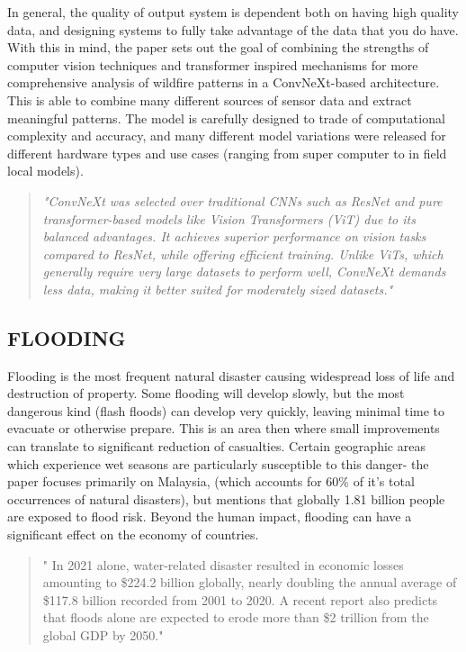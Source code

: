 \documentclass[conference,a4paper]{IEEEtran}
\begin{document}
In general, the quality of output system is dependent both on having high quality data, and designing systems to fully take advantage of the data that you do have. With this in mind, the paper sets out the goal of combining the strengths of computer vision techniques and transformer inspired mechanisms for more comprehensive analysis of wildfire patterns in a ConvNeXt-based architecture. This is able to combine many different sources of sensor data and extract meaningful patterns. The model is carefully designed to trade of computational complexity and accuracy, and many different model variations were released for different hardware types and use cases (ranging from super computer to in field local models).

\begin{quote}
\textit{"ConvNeXt was selected over traditional CNNs such as ResNet and pure transformer-based models like Vision Transformers (ViT) due to its balanced advantages. It achieves superior performance on vision tasks compared to ResNet, while offering efficient training. Unlike ViTs, which generally require very large datasets to perform well, ConvNeXt demands less data, making it better suited for moderately sized datasets."}
\end{quote}
\cite{elbohy2025fusion}


\subsection{FLOODING}

Flooding is the most frequent natural disaster causing widespread loss of life and destruction of property. Some flooding will develop slowly, but the most dangerous kind (flash floods) can develop very quickly, leaving minimal time to evacuate or otherwise prepare. This is an area then where small improvements can translate to significant reduction of casualties. Certain geographic areas which experience wet seasons are particularly susceptible to this danger- the paper focuses primarily on Malaysia, (which accounts for 60\% of it's total occurrences of natural disasters), but mentions that globally 1.81 billion people are exposed to flood risk. Beyond the human impact, flooding can have a significant effect on the economy of countries.

\begin{quote}
    " In 2021 alone, water-related disaster resulted in economic losses amounting to \$224.2 billion  globally, nearly doubling the annual average of \$117.8 billion recorded from 2001 to 2020. A recent report also predicts that floods alone are expected to erode more than \$2 trillion from the global GDP by 2050."
\end{quote}
\end{document}
